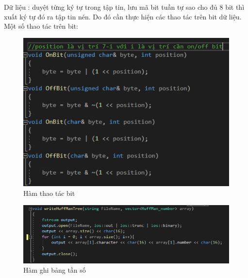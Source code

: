 \documentclass[14pt]{extreport}
\begin{document}
Dữ liệu : duyệt từng ký tự trong tập tin, lưu mã bit tuần tự sao cho đủ 8 bit thì xuất ký tự đó ra tập tin nén. Do đó cần thực hiện các thao tác trên bit dữ liệu. Một số thao tác trên bit:
\begin{center}
    \begin{figure}[H]
    \begin{center}
     \includegraphics[scale=1.0]{bit on off.PNG}
    \end{center}
    \caption{Hàm thao tác bit}
    \label{refhinh1}
    \end{figure}
\end{center}

\begin{center}
    \begin{figure}[H]
    \begin{center}
     \includegraphics[scale=1.0]{write_huffman_tree.PNG}
    \end{center}
    \caption{Hàm ghi bảng tần số}
    \label{refhinh1}
    \end{figure}
\end{center}
\end{document}
